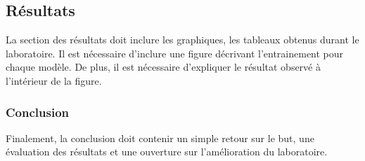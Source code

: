 \documentclass{article}
\begin{document}
\subsection{Résultats}
La section des résultats doit inclure les graphiques, les tableaux obtenus durant le laboratoire. Il est nécessaire d'inclure une figure décrivant l'entrainement pour chaque modèle. De plus, il est nécessaire d'expliquer le résultat observé à l'intérieur de la figure.

\subsubsection{Conclusion}
Finalement, la conclusion doit contenir un simple retour sur le but, une évaluation des résultats et une ouverture sur l'amélioration du laboratoire.


\end{document}
